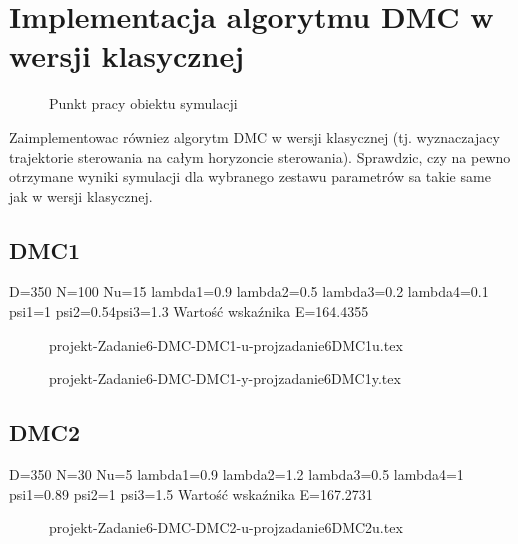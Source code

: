 \section{Implementacja algorytmu DMC w wersji klasycznej}
\label{projekt:zad6}


\ifdefined\CompileFigures
    \begin{figure}[H] 
        \centering
        
        \caption{Punkt pracy obiektu symulacji}
        \label{projekt:zad1:figure:charstat_u_y_z}
    \end{figure}
\fi

Zaimplementowac równiez algorytm DMC w wersji klasycznej (tj. wyznaczajacy trajektorie
sterowania na całym horyzoncie sterowania). Sprawdzic, czy na pewno otrzymane
wyniki symulacji dla wybranego zestawu parametrów sa takie same jak w wersji
klasycznej.

\subsection{DMC1}
D=350 N=100 Nu=15 
lambda1=0.9 lambda2=0.5 lambda3=0.2 lambda4=0.1 
psi1=1 psi2=0.54psi3=1.3 
Wartość wskaźnika E=164.4355


\ifdefined\CompileFigures
    \begin{figure}[H] 
            \centering
            
            \caption{projekt-Zadanie6-DMC-DMC1-u-projzadanie6DMC1u.tex}
            \label{projekt:zad6:figure:projzadanie6DMC1u}
    \end{figure}
\fi


\ifdefined\CompileFigures
    \begin{figure}[H] 
            \centering
            
            \caption{projekt-Zadanie6-DMC-DMC1-y-projzadanie6DMC1y.tex}
            \label{projekt:zad6:figure:projzadanie6DMC1y}
    \end{figure}
\fi

\subsection{DMC2}
D=350 N=30 Nu=5 
lambda1=0.9 lambda2=1.2 lambda3=0.5 lambda4=1 
psi1=0.89 psi2=1 psi3=1.5 
Wartość wskaźnika E=167.2731


\ifdefined\CompileFigures
    \begin{figure}[H] 
            \centering
            
            \caption{projekt-Zadanie6-DMC-DMC2-u-projzadanie6DMC2u.tex}
            \label{projekt:zad6:figure:projzadanie6DMC2u}
    \end{figure}
\fi


